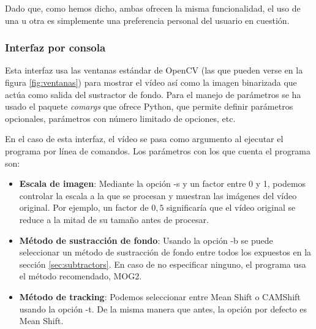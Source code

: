 Dado que, como hemos dicho, ambas ofrecen la misma funcionalidad, el uso de una u otra es simplemente una preferencia personal del usuario en cuestión.

\subsubsection*{Interfaz por consola}
Esta interfaz usa las ventanas estándar de OpenCV (las que pueden verse en la figura \ref{fig:ventanas}) para mostrar el vídeo así como la imagen binarizada que actúa como salida del sustractor de fondo. Para el manejo de parámetros se ha usado el paquete \textit{comargs} que ofrece Python, que permite definir parámetros opcionales, parámetros con número limitado de opciones, etc.

En el caso de esta interfaz, el vídeo se pasa como argumento al ejecutar el programa por línea de comandos. Los parámetros con los que cuenta el programa son:

\begin{itemize}
  \item \textbf{Escala de imagen}: Mediante la opción -s y un factor entre 0 y 1, podemos controlar la escala a la que se procesan y muestran las imágenes del vídeo original. Por ejemplo, un factor de $0,5$ significaría que el vídeo original se reduce a la mitad de su tamaño antes de procesar.
  \item \textbf{Método de sustracción de fondo}: Usando la opción -b se puede seleccionar un método de sustracción de fondo entre todos los expuestos en la sección \ref{sec:subtractors}. En caso de no especificar ninguno, el programa usa el método recomendado, MOG2.
  \item \textbf{Método de tracking}: Podemos seleccionar entre Mean Shift o CAMShift usando la opción -t. De la misma manera que antes, la opción por defecto es Mean Shift.
\end{itemize}

